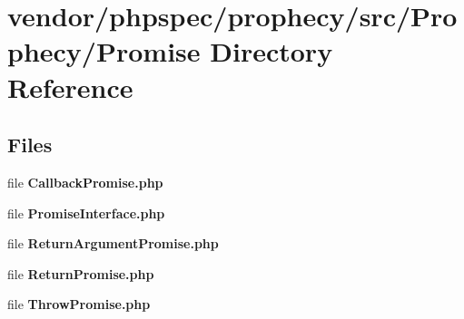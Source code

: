 \section{vendor/phpspec/prophecy/src/\+Prophecy/\+Promise Directory Reference}
\label{dir_8182bccd07fbbe591b01c73d9e7e10f8}
\subsection*{Files}
\begin{DoxyCompactItemize}
\item 
file {\bf Callback\+Promise.\+php}
\item 
file {\bf Promise\+Interface.\+php}
\item 
file {\bf Return\+Argument\+Promise.\+php}
\item 
file {\bf Return\+Promise.\+php}
\item 
file {\bf Throw\+Promise.\+php}
\end{DoxyCompactItemize}

